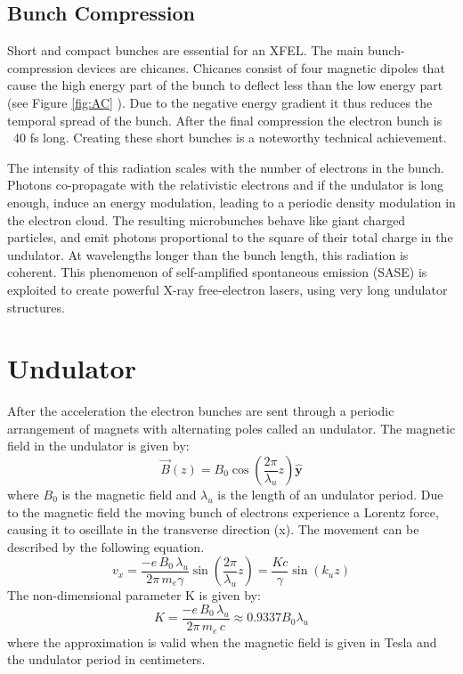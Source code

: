 \subsection{Bunch Compression}
Short and compact bunches are essential for an XFEL. The main bunch-compression devices are chicanes. Chicanes consist of four magnetic dipoles that cause the high energy part of the bunch to deflect less than the low energy part (see Figure \ref{fig:AC} ). Due to the negative energy gradient it thus reduces the temporal spread of the bunch. After the final compression the electron bunch is ~40 fs long. Creating these short bunches is a noteworthy technical achievement.


The intensity of this radiation scales with the number of electrons in the bunch. Photons co-propagate with the relativistic electrons and if the undulator is long enough, induce an energy modulation, leading to a periodic density modulation in the electron cloud. The resulting microbunches behave like giant charged particles, and emit photons proportional to the square of their total charge in the undulator. At wavelengths longer than the bunch length, this radiation is coherent. This phenomenon of self-amplified spontaneous emission (SASE) is exploited to create powerful X-ray free-electron lasers, using very long undulator structures.




\section{Undulator}
After the acceleration the electron bunches are sent through a periodic arrangement of magnets with alternating poles called an undulator. The magnetic field in the undulator is given by:
\begin{equation}\vec{B}(z) = B_0\cos{(\frac{2\pi}{\lambda_u}z)}\hat{\mathbf{y}}\label{eq:bz}\end{equation}
where $B_0$ is the magnetic field and $\lambda_u$ is the length of an undulator period.
Due to the magnetic field the moving bunch of electrons experience a Lorentz force, causing it to oscillate in the transverse direction (x). The movement can be described by the following equation. 
\begin{equation}v_x = \frac{-e\,B_0\,\lambda_u}{2\pi\,m_e\gamma} \sin{(\frac{2\pi}{\lambda_u}z)} = \frac{K c}{\gamma} \sin{(k_uz)}\label{eq:vx}\end{equation}
The non-dimensional parameter K is given by:
\[K =  \frac{-e\,B_0\,\lambda_u}{2\pi\,m_e \, c}  \approx 0.9337 B_0 \lambda_u\]
where the approximation is valid when the magnetic field is given in Tesla and the undulator period in centimeters.

